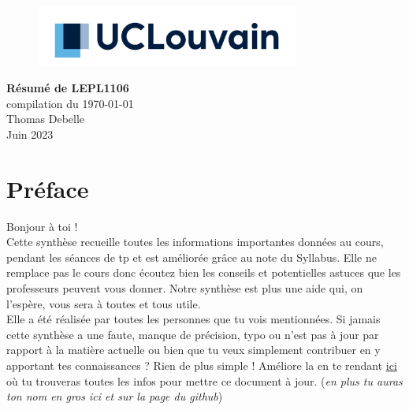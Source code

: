 \documentclass{report}
\begin{document}
\begin{titlepage}
    \begin{figure}
        \includegraphics[height = 2cm]{UCL_Logo.png}
        \label{fig:my_label}
    \end{figure}

    \hspace*{100cm}
    \centering
    \vspace*{7cm}

    {\Huge \textbf{Résumé de LEPL1106}}\\
    \vspace*{0.25cm}
    compilation du \today\\
    \vspace*{0.25cm}
    \Large{Thomas Debelle}\\

    \vspace*{9.5cm}
    {\Large Juin 2023}
\end{titlepage}


\tableofcontents
\newpage

\section*{Préface}

Bonjour à toi !\\

Cette synthèse recueille toutes les informations importantes données au cours, pendant les séances de tp et est améliorée grâce au note du Syllabus. Elle ne remplace pas le cours donc écoutez bien les conseils et potentielles astuces que les professeurs peuvent vous donner. Notre synthèse est plus une aide qui, on l'espère, vous sera à toutes et tous utile.\\

Elle a été réalisée par toutes les personnes que tu vois mentionnées. Si jamais cette synthèse a une faute, manque de précision, typo ou n'est pas à jour par rapport à la matière actuelle ou bien que tu veux simplement contribuer en y apportant tes connaissances ? Rien de plus simple ! Améliore la en te rendant \href{http://www.github.com/Tfloow/Q4_EPL}{ici} où tu trouveras toutes les infos pour mettre ce document à jour. (\textit{en plus tu auras ton nom en gros ici et sur la page du github})\\
\end{document}
